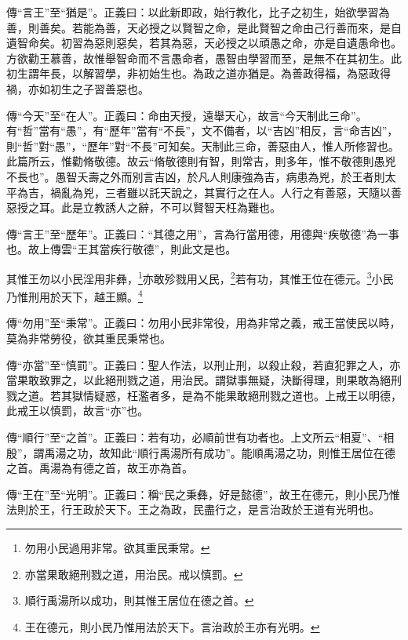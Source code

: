 {\noindent\zhuan{}\fzbyks 傳“言王”至“猶是”。正義曰：以此新即政，始行教化，比子之初生，始欲學習為善，則善矣。若能為善，天必授之以賢智之命，是此賢智之命由己行善而來，是自遺智命矣。初習為惡則惡矣，若其為惡，天必授之以頑愚之命，亦是自遺愚命也。方欲勸王慕善，故惟舉智命而不言愚命者，愚智由學習而至，是無不在其初生。此初生謂年長，以解習學，非初始生也。為政之道亦猶是。為善政得福，為惡政得禍，亦如初生之子習善惡也。 \par}

{\noindent\zhuan{}\fzbyks 傳“今天”至“在人”。正義曰：命由天授，遠舉天心，故言“今天制此三命”。有“哲”當有“愚”，有“歷年”當有“不長”，文不備者，以“吉凶”相反，言“命吉凶”，則“哲”對“愚”，“歷年”對“不長”可知矣。天制此三命，善惡由人，惟人所修習也。此篇所云，惟勸脩敬德。故云“脩敬德則有智，則常吉，則多年，惟不敬德則愚兇不長也”。愚智夭壽之外而別言吉凶，於凡人則康強為吉，病患為兇，於王者則太平為吉，禍亂為兇，三者雖以託天說之，其實行之在人。人行之有善惡，天隨以善惡授之耳。此是立教誘人之辭，不可以賢智天枉為難也。 \par}

{\noindent\zhuan{}\fzbyks 傳“言王”至“歷年”。正義曰：“其德之用”，言為行當用德，用德與“疾敬德”為一事也。故上傳雲“王其當疾行敬德”，則此文是也。 \par}

其惟王勿以小民淫用非彝，\footnote{勿用小民過用非常。欲其重民秉常。}亦敢殄戮用乂民，\footnote{亦當果敢絕刑戮之道，用治民。戒以慎罰。}若有功，其惟王位在德元。\footnote{順行禹湯所以成功，則其惟王居位在德之首。}小民乃惟刑用於天下，越王顯。\footnote{王在德元，則小民乃惟用法於天下。言治政於王亦有光明。}

{\noindent\zhuan{}\fzbyks 傳“勿用”至“秉常”。正義曰：勿用小民非常役，用為非常之義，戒王當使民以時，莫為非常勞役，欲其重民秉常也。 \par}

{\noindent\zhuan{}\fzbyks 傳“亦當”至“慎罰”。正義曰：聖人作法，以刑止刑，以殺止殺，若直犯罪之人，亦當果敢致罪之，以此絕刑戮之道，用治民。謂獄事無疑，決斷得理，則果敢為絕刑戮之道。若其獄情疑惑，枉濫者多，是為不能果敢絕刑戮之道也。上戒王以明德，此戒王以慎罰，故言“亦”也。 \par}

{\noindent\zhuan{}\fzbyks 傳“順行”至“之首”。正義曰：若有功，必順前世有功者也。上文所云“相夏”、“相殷”，謂禹湯之功，故知此“順行禹湯所有成功”。能順禹湯之功，則惟王居位在德之首。禹湯為有德之首，故王亦為首。 \par}

{\noindent\zhuan{}\fzbyks 傳“王在”至“光明”。正義曰：稱“民之秉彝，好是懿德”，故王在德元，則小民乃惟法則於王，行王政於天下。王之為政，民盡行之，是言治政於王道有光明也。 \par}

